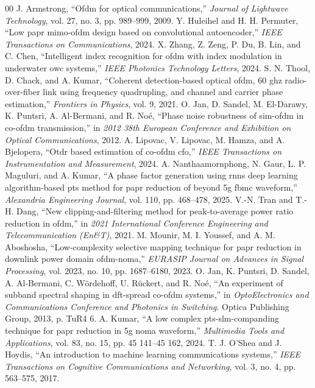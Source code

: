 \documentclass[conference]{IEEEtran}
\begin{document}
\begin{thebibliography}{00}
 J. Armstrong, ``Ofdm for optical communications,'' \emph{Journal of Lightwave Technology}, vol. 27, no. 3, pp. 989--999, 2009.
 Y. Huleihel and H. H. Permuter, ``Low papr mimo-ofdm design based on convolutional autoencoder,'' \emph{IEEE Transactions on Communications}, 2024.
 X. Zhang, Z. Zeng, P. Du, B. Lin, and C. Chen, ``Intelligent index recognition for ofdm with index modulation in underwater owc systems,'' \emph{IEEE Photonics Technology Letters}, 2024.
 S. N. Thool, D. Chack, and A. Kumar, ``Coherent detection-based optical ofdm, 60 ghz radio-over-fiber link using frequency quadrupling, and channel and carrier phase estimation,'' \emph{Frontiers in Physics}, vol. 9, 2021.
 O. Jan, D. Sandel, M. El-Darawy, K. Puntsri, A. Al-Bermani, and R. No\'{e}, ``Phase noise robustness of sim-ofdm in co-ofdm transmission,'' in \emph{2012 38th European Conference and Exhibition on Optical Communications}, 2012.
 A. Lipovac, V. Lipovac, M. Hamza, and A. Bjelopera, ``Otdr based estimation of co-ofdm cfo,'' \emph{IEEE Transactions on Instrumentation and Measurement}, 2024.
 A. Nanthaamornphong, N. Gaur, L. P. Maguluri, and A. Kumar, ``A phase factor generation using rnns deep learning algorithm-based pts method for papr reduction of beyond 5g fbmc waveform,'' \emph{Alexandria Engineering Journal}, vol. 110, pp. 468--478, 2025.
 V.-N. Tran and T.-H. Dang, ``New clipping-and-filtering method for peak-to-average power ratio reduction in ofdm,'' in \emph{2021 International Conference Engineering and Telecommunication (En\&T)}, 2021.
 M. Mounir, M. I. Youssef, and A. M. Aboshosha, ``Low-complexity selective mapping technique for papr reduction in downlink power domain ofdm-noma,'' \emph{EURASIP Journal on Advances in Signal Processing}, vol. 2023, no. 10, pp. 1687--6180, 2023.
 O. Jan, K. Puntsri, D. Sandel, A. Al-Bermani, C. W\"{o}rdehoff, U. R\"{u}ckert, and R. No\'{e}, ``An experiment of subband spectral shaping in dft-spread co-ofdm systems,'' in \emph{OptoElectronics and Communications Conference and Photonics in Switching}. Optica Publishing Group, 2013, p. TuR4 6.
 A. Kumar, ``A low complex pts-slm-companding technique for papr reduction in 5g noma waveform,'' \emph{Multimedia Tools and Applications}, vol. 83, no. 15, pp. 45 141--45 162, 2024.
 T. J. O'Shea and J. Hoydis, ``An introduction to machine learning communications systems,'' \emph{IEEE Transactions on Cognitive Communications and Networking}, vol. 3, no. 4, pp. 563--575, 2017.

\end{thebibliography}
\end{document}
